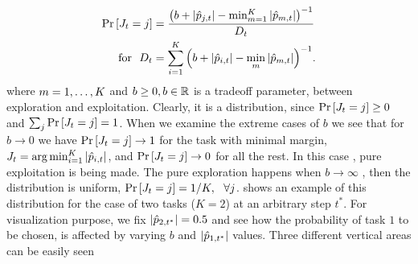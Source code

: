 \begin{equation}
\begin{aligned}
{\rm Pr}\left[{J_t=j}\right]&=\frac{\left({b+\left\vert{\hat{p}_{j,t}}\right\vert-\min_{m=1}^K\left\vert{\hat{p}_{m,t}}\right\vert}\right)^{-1}}{D_t}\\
~ \textrm { for } ~
D_{t}&=\sum_{i=1}^{K}{\left({b+\left\vert{\hat{p}_{i,t}}\right\vert-\min_{m}\left\vert{\hat{p}_{m,t}}\right\vert}\right)^{-1}}.
\label{eq:prob}
\end{aligned}
\end{equation} 
%
where $m=1 , \ldots , K$ and $b\geq 0, b\in\mathbb{R}$ is a tradeoff parameter, between exploration and
exploitation. Clearly, it is a distribution, since ${\rm Pr}\left[{J_t=j}\right]\geq 0$ and $\sum_j {\rm Pr}\left[{J_t=j}\right]=1$. 
When we examine the extreme cases  of $b$ we see that  for $b\rightarrow0$
we have ${\rm Pr}\left[{J_t=j}\right]\rightarrow1$ for the task with minimal margin, $J_t=\arg\min_{i=1}^K\left\vert{\hat{p}_{i,t}}\right\vert$,  and ${\rm Pr}\left[{J_t=j}\right]\rightarrow0$ for all the rest. In this case , pure exploitation is being made. The pure exploration happens when   $b\rightarrow \infty$
, then the distribution is uniform, $ {\rm Pr}\left[{J_t=j}\right]= 1/K,~~ \forall j $.  
shows an example of this distribution for the case of two tasks ($K=2$) at an arbitrary step $t^*$. 
For visualization purpose, we fix 
$\left\vert{\hat{p}_{2,t^*}}\right\vert=0.5$ and see how the probability of task $1$ to be chosen,
 is affected by varying $b$ and $\left\vert{\hat{p}_{1,t^*}}\right\vert$ values. 
 Three different vertical areas  can be easily seen 

